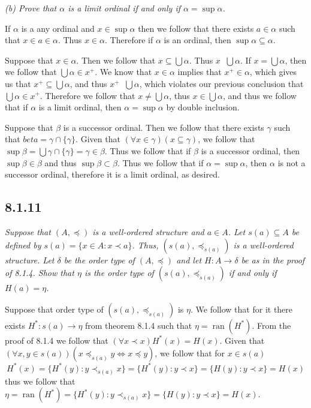 \documentclass[11pt,oneside,titlepage]{book}
\DeclareMathOperator \ran {ran}
\DeclareMathOperator \ineq {\underline{\in}}
\newcommand{\set}[1]{\{ #1 \}}
\begin{document}
\textit{(b) Prove that $\alpha$ is a limit ordinal if and only if $\alpha = \sup \alpha$.}

If $\alpha$ is a any ordinal and $x \in \sup{\alpha}$ then we follow that there
exists $a \in \alpha$ such that $x \in a \in \alpha$. Thus $x \in \alpha$. Therefore
if $\alpha$ is an ordinal, then $\sup \alpha \subseteq \alpha$. 

Suppose that $x \in \alpha$. Then we follow that
$x \subseteq \bigcup \alpha$. Thus $x \ineq \bigcup{\alpha}$. If $x = \bigcup{\alpha}$,
then we follow that $\bigcup{\alpha} \in x^+$. We know that $x \in \alpha$ implies that
$x^+ \in \alpha$, which gives us that $x^+ \subseteq \bigcup{\alpha}$, and thus
$x^+ \ineq \bigcup{\alpha}$, which violates our previous
conclusion that $\bigcup{\alpha} \in x^+$. Therefore we follow that $x \neq \bigcup{\alpha}$,
thus $x \in \bigcup{\alpha}$, and thus we follow that if $\alpha$ is a limit ordinal,
then $\alpha = \sup\alpha$ by double inclusion.

Suppose that $\beta$ is a successor ordinal. Then we follow that there exists $\gamma$
such that $beta = \gamma \cap \set{\gamma}$. Given that
$(\forall x \in \gamma)(x \subseteq \gamma)$, we follow that $\sup \beta =
\bigcup{\gamma \cap \set{\gamma}} = \gamma \in \beta$. Thus we follow that
if $\beta$ is a successor ordinal, then $\sup \beta \in \beta$ and thus
$\sup \beta \subset \beta$. Thus we follow that if $\alpha = \sup \alpha$, then
$\alpha$ is not a successor ordinal, therefore it is a limit ordinal, as desired.

\subsection*{8.1.11}

\textit{Suppose that $(A, \preceq)$ is a well-ordered structure and $a \in A$.
  Let $s(a) \subseteq A$ be defined by $s(a) = \set{x \in A: x \prec a}$.
  Thus, $(s(a), \preceq_{s(a)})$ is a well-ordered structure. Let $\delta$ be the
  order type of $(A, \preceq)$ and let $H: A \to \delta$ be as in the proof of 8.1.4.
  Show that $\eta$ is the order type of $(s(a), \preceq_{s(a)})$ if and only if
  $H(a) = \eta$.}

Suppose that order type of $(s(a), \preceq_{s(a)})$ is $\eta$. We follow that for it
there exists $H^*: s(a) \to \eta$ from theorem 8.1.4 such that $\eta = \ran(H^*)$. From the
proof of 8.1.4 we follow that $(\forall x \prec x)H^*(x) = H(x)$. Given that
$(\forall x, y \in s(a))(x \preceq_{s(a)} y \iff x \preceq y)$,
we follow that for $x \in s(a)$
$$H^*(x) = \set{H^*(y): y \prec_{s(a)} x} = \set{H^*(y): y \prec x} =
\set{H(y): y \prec x} = H(x)$$
thus we follow that $\eta = \ran(H^*) = \set{H^*(y): y \prec_{s(a)} x} = \set{H(y): y \prec x} =
H(x)$.
\end{document}
